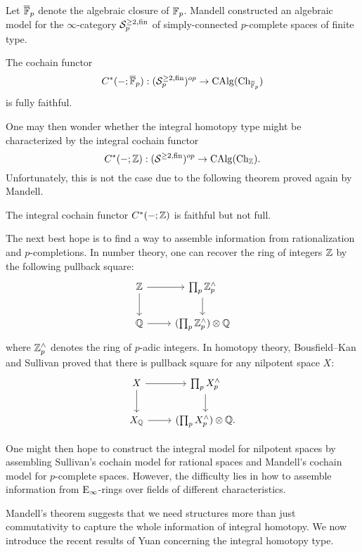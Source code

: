Let $\overline{{\mathbb{F}}}_p$ denote the algebraic closure of ${\mathbb{F}}_p$. Mandell constructed an algebraic model for the $\infty$-category ${\mathcal{S}}^{\geq 2, \operatorname{fin}}_p$ of simply-connected $p$-complete spaces of finite type.
\begin{theorem}
    \cite{Mandell_p-adic}
    The cochain functor 
    $$
    C^*(-;\overline{{\mathbb{F}}}_p): 
    ({\mathcal{S}}^{\geq 2, \operatorname{fin}}_p)^{op} 
    \to 
    \operatorname{CAlg}(\operatorname{Ch}_{\overline{{\mathbb{F}}}_p})
    $$
    is fully faithful.
\end{theorem}
One may then wonder whether the integral homotopy type might be characterized by the integral cochain functor
$$
C^*(-;{\mathbb{Z}}): 
    ({\mathcal{S}}^{\geq 2, \operatorname{fin}})^{op} 
    \to 
    \operatorname{CAlg}(\operatorname{Ch}_{{\mathbb{Z}}}).
$$
Unfortunately, this is not the case due to the following theorem proved again by Mandell.
\begin{theorem}
    \cite{Mandell_Cochain}
    The integral cochain functor $C^*(-;{\mathbb{Z}})$ is faithful but not full.
\end{theorem}
The next best hope is to find a way to assemble information from rationalization and $p$-completions.
In number theory, one can recover the ring of integers ${\mathbb{Z}}$ by the following pullback square:
\[
\begin{tikzcd}
\BZ & \prod_{p} \BZ^{\wedge}_{p}  \\
\BQ & (\prod_{p} \BZ^{\wedge}_{p}) \otimes \BQ
        \arrow[from=1-1, to=1-2]
		\arrow[from=2-1, to=2-2]
		\arrow[from=1-1, to=2-1]
		\arrow[from=1-2, to=2-2]
\end{tikzcd}
\]
where ${\mathbb{Z}}^{\wedge}_p$ denotes the ring of $p$-adic integers. In homotopy theory, Bousfield--Kan \cite{Bousfield-KanYellow} and Sullivan \cite{Sullivan05} proved that there is pullback square for any nilpotent space $X$:
\[
\begin{tikzcd}
X & \prod_{p} X^{\wedge}_{p}  \\
X_\BQ & (\prod_{p} X^{\wedge}_{p}) \otimes \BQ.
        \arrow[from=1-1, to=1-2]
		\arrow[from=2-1, to=2-2]
		\arrow[from=1-1, to=2-1]
		\arrow[from=1-2, to=2-2]
\end{tikzcd}
\]

One might then hope to construct the integral model for nilpotent spaces by assembling Sullivan's cochain model for rational spaces and Mandell's cochain model for $p$-complete spaces. However, the difficulty lies in how to assemble information from $\operatorname{E}_{\infty}$-rings over fields of different characteristics.

Mandell's theorem suggests that we need structures more than just commutativity to capture the whole information of integral homotopy.
We now introduce the recent results of Yuan \cite{Yuan} concerning the integral homotopy type.

